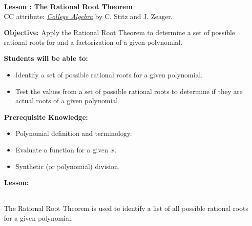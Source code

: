 \documentclass[12pt]{article}
\theoremstyle{definition}
\begin{document}
{\bf \large Lesson : The Rational Root Theorem}
\\ CC attribute: \href{http://www.stitz-zeager.com}{\it{College Algebra}} by C. Stitz and J. Zeager. 
\hfill \doclicenseImage[imagewidth=5em]\\
\par
{\bf Objective:} Apply the Rational Root Theorem to determine a set of possible rational roots for and a factorization of a given polynomial.\\
\par
{\bf Students will be able to:}
\begin{itemize}
	\item Identify a set of possible rational roots for a given polynomial.
	\item Test the values from a set of possible rational roots to determine if they are actual roots of a given polynomial.
\end{itemize}
{\bf Prerequisite Knowledge:}
\begin{itemize}
	\item Polynomial definition and terminology.
	\item Evaluate a function for a given $x$.
	\item Synthetic (or polynomial) division.
\end{itemize}
\hrulefill

{\bf Lesson:}\\
\ \par

The Rational Root Theorem is used to identify a list of all possible rational roots for a given polynomial.

\begin{center}
\end{center}
\end{document}

